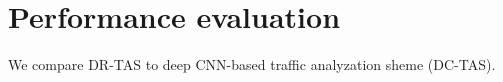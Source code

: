 \documentclass[10pt, twoside, jounal]{IEEEtran}
\begin{document}
\section{Performance evaluation}
We compare DR-TAS to deep CNN-based traffic analyzation sheme (DC-TAS).
\end{document}

